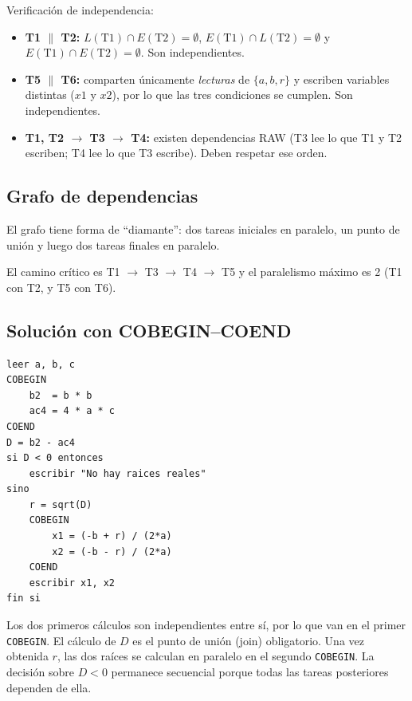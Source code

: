 Verificaci\'on de independencia:
\begin{itemize}[leftmargin=1.4cm]
    \item \textbf{T1 $\parallel$ T2:} $L(\text{T1}) \cap E(\text{T2}) =
    \emptyset$, $E(\text{T1}) \cap L(\text{T2}) = \emptyset$ y
    $E(\text{T1}) \cap E(\text{T2}) = \emptyset$. Son independientes.
    \item \textbf{T5 $\parallel$ T6:} comparten \'unicamente \emph{lecturas}
    de $\{a,b,r\}$ y escriben variables distintas ($x1$ y $x2$), por lo que las
    tres condiciones se cumplen. Son independientes.
    \item \textbf{T1, T2 $\rightarrow$ T3 $\rightarrow$ T4:} existen
    dependencias RAW (T3 lee lo que T1 y T2 escriben; T4 lee lo que T3
    escribe). Deben respetar ese orden.
\end{itemize}

\subsection*{Grafo de dependencias}
El grafo tiene forma de ``diamante'': dos tareas iniciales en paralelo, un
punto de uni\'on y luego dos tareas finales en paralelo.

\begin{center}
\end{center}

El camino cr\'itico es T1 $\rightarrow$ T3 $\rightarrow$ T4 $\rightarrow$ T5 y
el paralelismo m\'aximo es 2 (T1 con T2, y T5 con T6).

\subsection*{Soluci\'on con COBEGIN--COEND}
\begin{lstlisting}
leer a, b, c
COBEGIN
    b2  = b * b
    ac4 = 4 * a * c
COEND
D = b2 - ac4
si D < 0 entonces
    escribir "No hay raices reales"
sino
    r = sqrt(D)
    COBEGIN
        x1 = (-b + r) / (2*a)
        x2 = (-b - r) / (2*a)
    COEND
    escribir x1, x2
fin si
\end{lstlisting}

\noindent
Los dos primeros c\'alculos son independientes entre s\'i, por lo que van en el
primer \texttt{COBEGIN}. El c\'alculo de $D$ es el punto de uni\'on (join)
obligatorio. Una vez obtenida $r$, las dos ra\'ices se calculan en paralelo en
el segundo \texttt{COBEGIN}. La decisi\'on sobre $D < 0$ permanece secuencial
porque todas las tareas posteriores dependen de ella.
